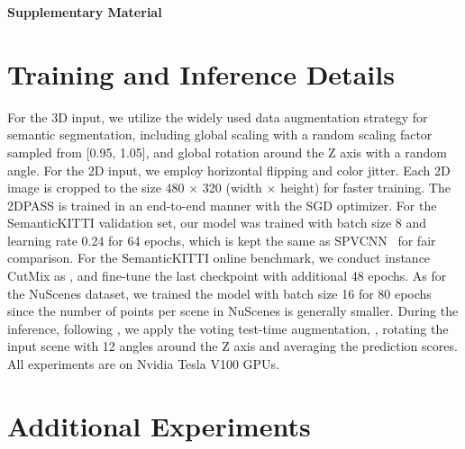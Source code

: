 \documentclass[runningheads]{llncs}
\begin{document}
	
	
	
	\newpage
	
	\setcounter{section}{0}
	\setcounter{figure}{0}
	\setcounter{table}{0}
	\renewcommand\thesection{\Alph{section}}
	
	{\Large\centering \textbf{Supplementary Material}} 
	
	


	
	\section{Training and Inference Details}
	\label{implementation}
For the 3D input, we utilize the widely used data augmentation strategy for semantic segmentation, including global scaling with a random scaling factor sampled from [0.95, 1.05], and global rotation around the Z axis with a random angle.
For the 2D input, we employ horizontal flipping and color jitter. Each 2D image is cropped to the size 480 $\times$ 320 (width $\times$ height) for faster training.
The 2DPASS is trained in an end-to-end manner with the SGD optimizer. 
For the SemanticKITTI validation set, our model was trained with batch size 8 and learning rate 0.24 for 64 epochs, which is kept the same as SPVCNN~\cite{tang2020searching} for fair comparison. 
For the SemanticKITTI online benchmark, we conduct instance CutMix as \cite{xu2021rpvnet}, and fine-tune the last checkpoint with additional 48 epochs.
As for the NuScenes dataset, we trained the model with batch size 16 for 80 epochs since the number of points per scene in NuScenes is generally smaller.
During the inference, following \cite{tang2020searching,zhou2020cylinder3d}, we apply the voting test-time augmentation, \ie, rotating the input scene with 12 angles around the Z axis and averaging the prediction scores.
All experiments are on Nvidia Tesla V100 GPUs.
	
	
	
	\label{exp}
	

	\section{Additional Experiments}
\end{document}
